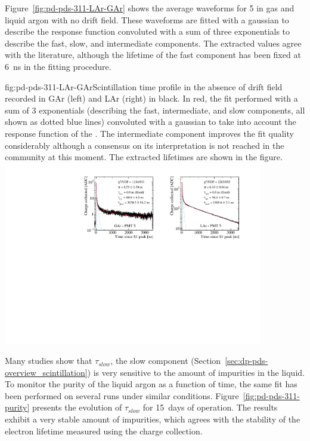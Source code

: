 Figure~\ref{fig:pd-pds-311-LAr-GAr} shows the average waveforms for  5 in gas and liquid argon with no drift field. These waveforms are fitted with a gaussian to describe the response function convoluted with a sum of three exponentials to describe the fast, slow, and intermediate components. 
The extracted values agree with the literature, although the lifetime of the fast component has been fixed at \SI{6}{ns} in the fitting procedure.

\begin{dunefigure}{fig:pd-pds-311-LAr-GAr}{Scintillation time profile in the absence of drift field recorded in GAr (left) and LAr (right) in black. In red, the fit performed with a sum of 3 exponentials (describing the fast, intermediate, and slow components, all shown as dotted blue lines) convoluted with a gaussian to take into account the response function of the . The intermediate component improves the fit quality considerably although a consensus on its interpretation is not reached in the community at this moment. The extracted lifetimes are shown in the figure.}
\includegraphics[width=0.85\textwidth]{graphics/dppd_311_lar_gar_fit.pdf}
\end{dunefigure}

Many studies show that $\tau_{slow}$, the slow component (Section~\ref{sec:dp-pds-overview_scintillation}) is very sensitive to the amount of impurities in the liquid.
To monitor the purity of the liquid argon as a function of time, the same fit has been performed on several runs under similar conditions. 
Figure~\ref{fig:pd-pds-311-purity} presents the evolution of $\tau_{slow}$ for \SI{15}{days} of operation.
The results exhibit a very stable amount of impurities, which agrees with the stability of the electron lifetime measured using the charge collection.

